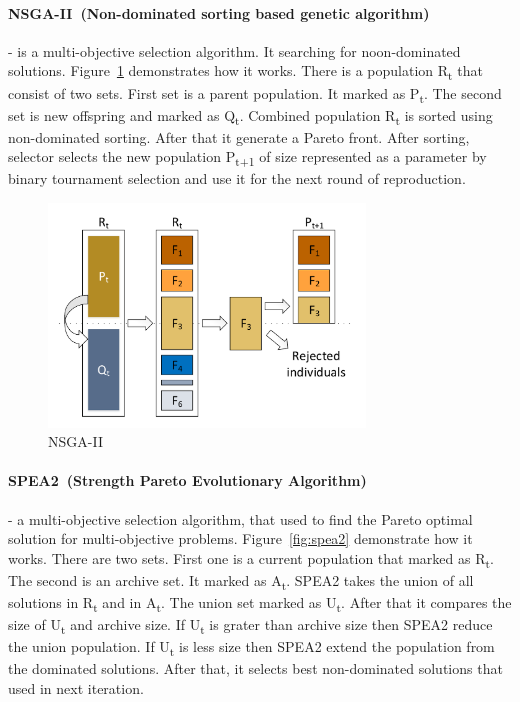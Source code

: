 	\paragraph{NSGA-II~(Non-dominated sorting based genetic algorithm)~\cite{deb2000}} - is a multi-objective selection algorithm. It searching for noon-dominated solutions. Figure~\ref{fig:nsga2} demonstrates how it works. There is a population \texorpdfstring{R\textsubscript{t}}{R t} that consist of two sets. First set is a parent population. It marked as \texorpdfstring{P\textsubscript{t}}{P t}. The second set is new offspring and marked as \texorpdfstring{Q\textsubscript{t}}{Q t}. Combined population \texorpdfstring{R\textsubscript{t}}{R t} is sorted using non-dominated sorting. After that it generate a Pareto front. After sorting, selector selects the new population \texorpdfstring{P\textsubscript{t+1}}{P t+1} of size represented as a parameter by binary tournament selection and use it for the next round of reproduction.
	
	\begin{figure}
		\centering
		\includegraphics[width=0.75\textwidth]{images/nsga2.pdf}
		\caption[NSGA-II]{NSGA-II}
		\label{fig:nsga2}
	\end{figure}
	
	\paragraph{SPEA2~(Strength Pareto Evolutionary Algorithm)~\cite{zitzler01}} - a multi-objective selection algorithm, that used to find the Pareto optimal solution for multi-objective problems\cite{zhihuan2010}. Figure~\ref{fig:spea2} demonstrate how it works.
	There are two sets. First one is a current population that marked as \texorpdfstring{R\textsubscript{t}}{R t}. The second is an archive set. It marked as \texorpdfstring{A\textsubscript{t}}{A t}. SPEA2 takes the union of all solutions in \texorpdfstring{R\textsubscript{t}}{R t} and in \texorpdfstring{A\textsubscript{t}}{A t}. The union set marked as \texorpdfstring{U\textsubscript{t}}{U t}. After that it compares the size of \texorpdfstring{U\textsubscript{t}}{U t} and archive size. If \texorpdfstring{U\textsubscript{t}}{U t} is grater than archive size then SPEA2 reduce the union population. If \texorpdfstring{U\textsubscript{t}}{U t} is less  size then SPEA2 extend the population from the dominated solutions. After that, it selects best non-dominated solutions that used in next iteration.
	

